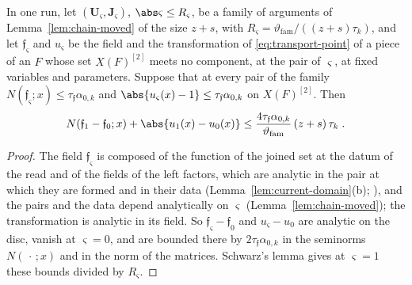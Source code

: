 \begin{lemma}\label{lem:read-inherited}
In one run, let $(\mathbf U_\varsigma, \mathbf J_\varsigma)$, $\abs\varsigma \leq R_\varsigma$, be a family of arguments of Lemma~\ref{lem:chain-moved} of the size $z + s$, with $R_\varsigma = \vartheta_{\mathrm{fam}}/((z + s)\tau_k)$, and let $\mathfrak f_\varsigma$ and $u_\varsigma$ be the field and the transformation of \eqref{eq:transport-point} of a piece of an $F$ whose set $X(F)^{[2]}$ meets no component, at the pair of $\varsigma$, at fixed variables and parameters. Suppose that at every pair of the family $N(\mathfrak f_\varsigma; x) \leq \tau_{\mathfrak f}\alpha_{0,k}$ and $\abs{u_\varsigma(x) - 1} \leq \tau_{\mathfrak f}\alpha_{0,k}$ on $X(F)^{[2]}$. Then
\[
    N(\mathfrak f_1 - \mathfrak f_0; x) + \abs{u_1(x) - u_0(x)} \leq \frac{4\tau_{\mathfrak f}\alpha_{0,k}}{\vartheta_{\mathrm{fam}}}\,(z + s)\,\tau_k\;.
\]
\end{lemma}

\begin{proof}
The field $\mathfrak f_\varsigma$ is composed of the function of the joined set at the datum of the read and of the fields of the left factors, which are analytic in the pair at which they are formed and in their data (Lemma~\ref{lem:current-domain}(b); \cite[Proposition~9]{BalabanVAR}), and the pairs and the data depend analytically on $\varsigma$ (Lemma~\ref{lem:chain-moved}); the transformation \cite[(106)]{BalabanAVG} is analytic in its field. So $\mathfrak f_\varsigma - \mathfrak f_0$ and $u_\varsigma - u_0$ are analytic on the disc, vanish at $\varsigma = 0$, and are bounded there by $2\tau_{\mathfrak f}\alpha_{0,k}$ in the seminorms $N(\,\cdot\,; x)$ and in the norm of the matrices. Schwarz's lemma gives at $\varsigma = 1$ these bounds divided by $R_\varsigma$.
\end{proof}


